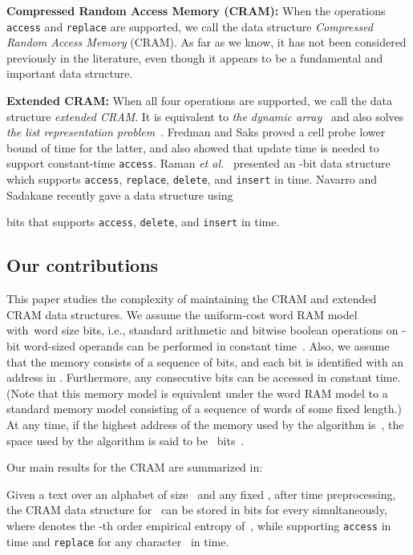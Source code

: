 \documentclass{llncs}
\begin{document}
\medskip

\noindent
\textbf{Compressed Random Access Memory (CRAM):}
When the operations \texttt{access} and \texttt{replace} are supported,
we call the data structure \emph{Compressed Random Access Memory} (CRAM).
As far as we know, it has not been considered previously in the literature,
even though it appears to be a fundamental and important data structure.

\medskip

\noindent
\textbf{Extended CRAM:}
When all four operations are supported,
we call the data structure \emph{extended CRAM}.
It is equivalent to \emph{the dynamic array}~\cite{RRR_WADS2001}
and also solves
\emph{the list representation problem}~\cite{FredmanS_STOC1989}.
Fredman and Saks \cite{FredmanS_STOC1989} proved
a cell probe lower bound of  time 
for the latter, and also showed that  update time is needed
to support constant-time \texttt{access}.
Raman \emph{et al.}~\cite{RRR_WADS2001}
presented an -bit data structure
which supports \texttt{access}, \texttt{replace}, \texttt{delete}, and
\texttt{insert} in  time.
Navarro and Sadakane \cite{NavSad10} recently gave a data structure using

bits that supports \texttt{access}, \texttt{delete}, and \texttt{insert}
in  time.


\subsection{Our contributions}

This paper studies the complexity of maintaining the CRAM and
extended CRAM data structures.
We assume the uniform-cost word RAM model with~word size
 bits,
i.e., 
standard arithmetic and bitwise boolean operations
on -bit word-sized operands can be performed in constant time~\cite{Hag98}.
Also, we assume that the memory consists of a sequence of
bits, and each bit is identified with an address in .
Furthermore, any consecutive  bits can be accessed in constant time.
(Note that this memory model is equivalent under the word RAM model to
a standard memory model consisting of a sequence of words of some fixed
length.)
At any time, if the highest address of the memory used by the algorithm
is~, the space used by the algorithm is said to be
~bits~\cite{HagerupR02}.

\smallskip

Our main results for the CRAM are summarized in:
\begin{theorem}\label{th:main1}
Given a text  over an alphabet of size~
and any fixed ,
after  time preprocessing,
the CRAM data structure for~ can be stored in
 bits
for every  simultaneously,
where  denotes the -th order empirical entropy of~,
while supporting \textnormal{\texttt{access}} in  time
and \textnormal{\texttt{replace}} for any character~
in  time.
\end{theorem}
\end{document}
